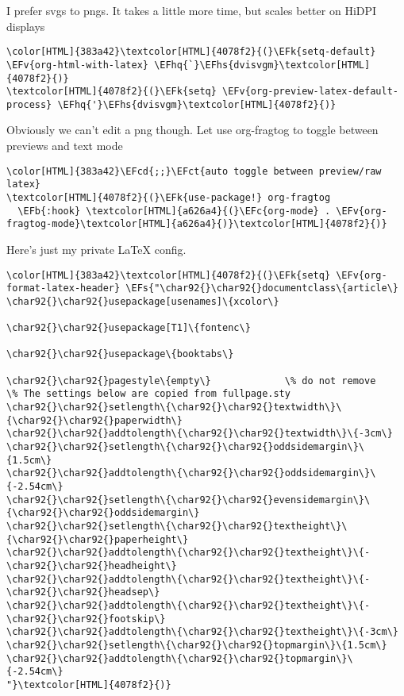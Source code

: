 \documentclass{scrartcl}
\newcommand{\EFk}[1]{\textcolor{EFk}{#1}} %
\newcommand{\EFs}[1]{\textcolor{EFs}{#1}} %
\newcommand{\EFb}[1]{\textcolor{EFb}{#1}} %
\newcommand{\EFct}[1]{\textcolor{EFct}{#1}} %
\newcommand{\EFc}[1]{\textcolor{EFc}{#1}} %
\newcommand{\EFv}[1]{\textcolor{EFv}{#1}} %
\newcommand{\EFcd}[1]{\textcolor{EFcd}{#1}} %
\newcommand{\EFhq}[1]{\textcolor{EFhq}{#1}} %
\newcommand{\EFhs}[1]{\textcolor{EFhs}{#1}} %
\begin{document}
I prefer svgs to pngs. It takes a little more time, but scales better on HiDPI displays
\begin{Code}
\begin{Verbatim}[]
\color[HTML]{383a42}\textcolor[HTML]{4078f2}{(}\EFk{setq-default} \EFv{org-html-with-latex} \EFhq{`}\EFhs{dvisvgm}\textcolor[HTML]{4078f2}{)}
\textcolor[HTML]{4078f2}{(}\EFk{setq} \EFv{org-preview-latex-default-process} \EFhq{'}\EFhs{dvisvgm}\textcolor[HTML]{4078f2}{)}
\end{Verbatim}
\end{Code}

Obviously we can't edit a png though. Let use org-fragtog to toggle between previews and text mode
\begin{Code}
\begin{Verbatim}[]
\color[HTML]{383a42}\EFcd{;;}\EFct{auto toggle between preview/raw latex}
\textcolor[HTML]{4078f2}{(}\EFk{use-package!} org-fragtog
  \EFb{:hook} \textcolor[HTML]{a626a4}{(}\EFc{org-mode} . \EFv{org-fragtog-mode}\textcolor[HTML]{a626a4}{)}\textcolor[HTML]{4078f2}{)}
\end{Verbatim}
\end{Code}

Here's just my private \LaTeX{} config.
\begin{Code}
\begin{Verbatim}[]
\color[HTML]{383a42}\textcolor[HTML]{4078f2}{(}\EFk{setq} \EFv{org-format-latex-header} \EFs{"\char92{}\char92{}documentclass\{article\}
\char92{}\char92{}usepackage[usenames]\{xcolor\}

\char92{}\char92{}usepackage[T1]\{fontenc\}

\char92{}\char92{}usepackage\{booktabs\}

\char92{}\char92{}pagestyle\{empty\}             \% do not remove
\% The settings below are copied from fullpage.sty
\char92{}\char92{}setlength\{\char92{}\char92{}textwidth\}\{\char92{}\char92{}paperwidth\}
\char92{}\char92{}addtolength\{\char92{}\char92{}textwidth\}\{-3cm\}
\char92{}\char92{}setlength\{\char92{}\char92{}oddsidemargin\}\{1.5cm\}
\char92{}\char92{}addtolength\{\char92{}\char92{}oddsidemargin\}\{-2.54cm\}
\char92{}\char92{}setlength\{\char92{}\char92{}evensidemargin\}\{\char92{}\char92{}oddsidemargin\}
\char92{}\char92{}setlength\{\char92{}\char92{}textheight\}\{\char92{}\char92{}paperheight\}
\char92{}\char92{}addtolength\{\char92{}\char92{}textheight\}\{-\char92{}\char92{}headheight\}
\char92{}\char92{}addtolength\{\char92{}\char92{}textheight\}\{-\char92{}\char92{}headsep\}
\char92{}\char92{}addtolength\{\char92{}\char92{}textheight\}\{-\char92{}\char92{}footskip\}
\char92{}\char92{}addtolength\{\char92{}\char92{}textheight\}\{-3cm\}
\char92{}\char92{}setlength\{\char92{}\char92{}topmargin\}\{1.5cm\}
\char92{}\char92{}addtolength\{\char92{}\char92{}topmargin\}\{-2.54cm\}
"}\textcolor[HTML]{4078f2}{)}
\end{Verbatim}
\end{Code}
\end{document}
